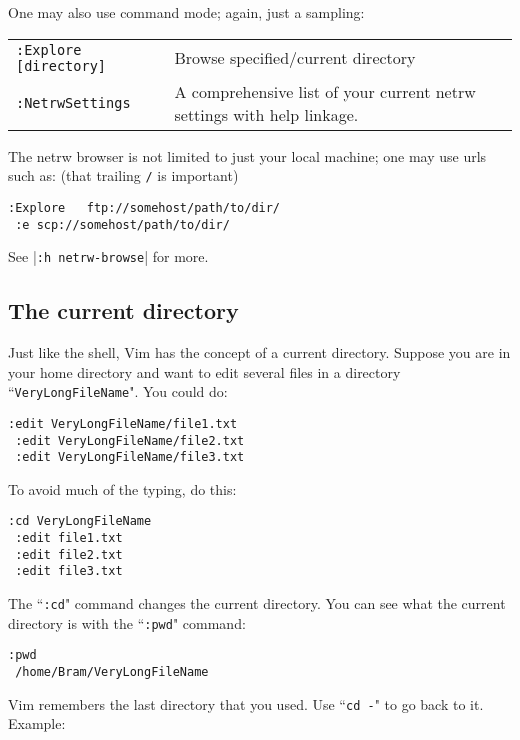 One may also use command mode; again, just a sampling:

\begin{center} \begin{longtable}{l l}
				\texttt{:Explore [directory]} & Browse specified/current directory \\
				\texttt{:NetrwSettings} & A comprehensive list of your current netrw settings with help linkage.
\end{longtable} \end{center}

The netrw browser is not limited to just your local machine; one may use urls such as:
(that trailing \texttt{/} is important)

\begin{Verbatim}[samepage=true]
 :Explore   ftp://somehost/path/to/dir/
 :e scp://somehost/path/to/dir/
\end{Verbatim}

See |\texttt{:h netrw-browse}| for more.
\subsection{The current directory}

Just like the shell, Vim has the concept of a current directory.
Suppose you are in your home directory and want to edit several files in a directory ``\texttt{VeryLongFileName}".
You could do:

\begin{Verbatim}[samepage=true]
 :edit VeryLongFileName/file1.txt
 :edit VeryLongFileName/file2.txt
 :edit VeryLongFileName/file3.txt
\end{Verbatim}

To avoid much of the typing, do this:

\begin{Verbatim}[samepage=true]
 :cd VeryLongFileName
 :edit file1.txt
 :edit file2.txt
 :edit file3.txt
\end{Verbatim}

The ``\texttt{:cd}" command changes the current directory.
You can see what the current directory is with the ``\texttt{:pwd}" command:

\begin{Verbatim}[samepage=true]
 :pwd
 /home/Bram/VeryLongFileName
\end{Verbatim}

Vim remembers the last directory that you used.
Use ``\texttt{cd -}" to go back to it.
Example:

